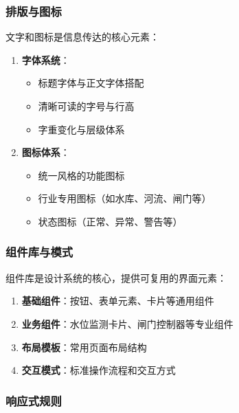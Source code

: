 \subsubsection{排版与图标}\label{ux6392ux7248ux4e0eux56feux6807}

文字和图标是信息传达的核心元素：

\begin{enumerate}
\def\labelenumi{\arabic{enumi}.}
\tightlist
\item
  \textbf{字体系统}：

  \begin{itemize}
  \tightlist
  \item
    标题字体与正文字体搭配
  \item
    清晰可读的字号与行高
  \item
    字重变化与层级体系
  \end{itemize}
\item
  \textbf{图标体系}：

  \begin{itemize}
  \tightlist
  \item
    统一风格的功能图标
  \item
    行业专用图标（如水库、河流、闸门等）
  \item
    状态图标（正常、异常、警告等）
  \end{itemize}
\end{enumerate}

\subsubsection{组件库与模式}\label{ux7ec4ux4ef6ux5e93ux4e0eux6a21ux5f0f}

组件库是设计系统的核心，提供可复用的界面元素：

\begin{enumerate}
\def\labelenumi{\arabic{enumi}.}
\tightlist
\item
  \textbf{基础组件}：按钮、表单元素、卡片等通用组件
\item
  \textbf{业务组件}：水位监测卡片、闸门控制器等专业组件
\item
  \textbf{布局模板}：常用页面布局结构
\item
  \textbf{交互模式}：标准操作流程和交互方式
\end{enumerate}

\subsubsection{响应式规则}\label{ux54cdux5e94ux5f0fux89c4ux5219}

